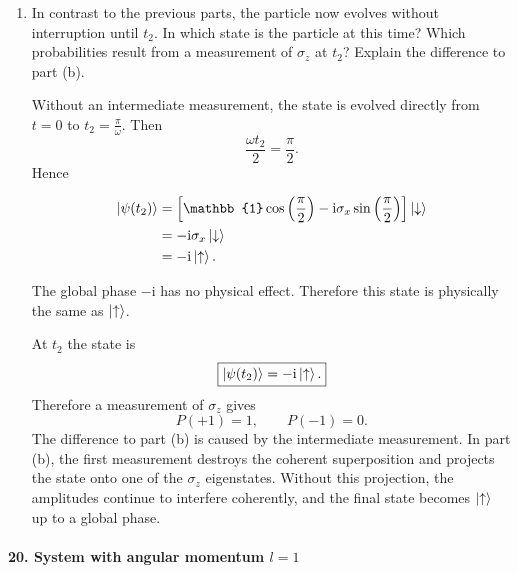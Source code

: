 \documentclass[11pt,a4paper]{scrartcl}
\newcommand{\ii}{\mathrm{i}}
\begin{document}
\begin{enumerate}[label=(\alph*)]
        \item In contrast to the previous parts, the particle now evolves without interruption until $t_2$. In which state is the particle at this time? Which probabilities result from a measurement of $\sigma_z$ at $t_2$? Explain the difference to part (b).

        \begin{calculationbox}
            Without an intermediate measurement, the state is evolved directly from $t=0$ to $t_2=\frac{\pi}{\omega}$.
            Then
            \[
                \frac{\omega t_2}{2}=\frac{\pi}{2}.
            \]
            Hence
            \begin{calculationbox}
                \begin{align*}
                    \ket{\psi(t_2)}
                    &= \left[\mathbb{1}\cos\left(\frac{\pi}{2}\right)-\ii\sigma_x\sin\left(\frac{\pi}{2}\right)\right]\ket{\downarrow} \\
                    &= -\ii\sigma_x\ket{\downarrow} \\
                    &= -\ii\ket{\uparrow}.
                \end{align*}
            \end{calculationbox}
            The global phase $-\ii$ has no physical effect. Therefore this state is physically the same as $\ket{\uparrow}$.
        \end{calculationbox}

        \begin{answerbox}
            At $t_2$ the state is
            \[
                \boxed{\ket{\psi(t_2)}=-\ii\ket{\uparrow}.}
            \]
            Therefore a measurement of $\sigma_z$ gives
            \[
                \boxed{P(+1)=1, \qquad P(-1)=0.}
            \]
            The difference to part (b) is caused by the intermediate measurement. In part (b), the first measurement destroys the coherent superposition and projects the state onto one of the $\sigma_z$ eigenstates. Without this projection, the amplitudes continue to interfere coherently, and the final state becomes $\ket{\uparrow}$ up to a global phase.
        \end{answerbox}
    \end{enumerate}

    \paragraph{20. System with angular momentum $l=1$}
\end{document}
